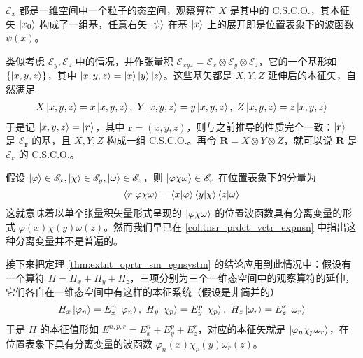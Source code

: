 \documentclass[cn,10pt,math=newtx,citestyle=gb7714-2015,bibstyle=gb7714-2015]{elegantbook}
\def\bm{\boldsymbol}
\def\ms{\mathscr}
\def\vphi{\varphi}
\def\ox{\otimes}
\begin{document}
$\ms E_x$ 都是一维空间中一个粒子的态空间，观察算符 $X$ 是其中的 C.S.C.O.，其本征矢 $\ket{x_0}$ 构成了一组基，任意右矢 $\ket{\psi}$ 在基 $\ket{x}$ 上的展开即是位置表象下的波函数 $\psi(x)$。

类似考虑 $\ms E_y,\ms E_z$ 中的情况，并作张量积 $\ms E_{xyz} = \ms E_x\ox\ms E_y\ox\ms E_z$，它的一个基形如 $\{\ket{x,y,z}\}$，其中 $\ket{x,y,z} = \ket x\ket y\ket z$。这些基矢都是 $X,Y,Z$ 延伸后的本征矢，自然满足
\begin{align}
    X\ket{x,y,z} = x\ket{x,y,z},\ Y\ket{x,y,z} = y\ket{x,y,z},\ Z\ket{x,y,z} = z\ket{x,y,z}
\end{align}
于是记 $\ket{x,y,z} = \ket{\bm r}$，其中 $\bm r = (x,y,z)$，则与之前推导的性质完全一致：$\ket{\bm r}$ 是 $\ms E_{\bm r}$ 的基，且 $X,Y,Z$ 构成一组 C.S.C.O.。再令 $\bm R = X\ox Y\ox Z$，就可以说 $\bm R$ 是 $\ms E_{\bm r}$ 的 C.S.C.O.。

假设 $\ket{\vphi}\in\ms E_x,\ket{\chi}\in\ms E_y,\ket{\omega}\in\ms E_z$，则 $\ket{\vphi\chi\omega}\in\ms E_{\bm r}$ 在位置表象下的分量为
\begin{equation}
    \braket{\bm r|\vphi\chi\omega} = \braket{x|\vphi}\braket{y|\chi}\braket{z|\omega}
\end{equation}
这就意味着以单个张量积矢量形式呈现的 $\ket{\vphi\chi\omega}$ 的位置波函数具有分离变量的形式 $\vphi(x)\chi(y)\omega(z)$。然而我们早已在 \ref{col:tnsr_prdct_vctr_expnsn} 中指出这种分离变量并不是普遍的。

接下来把定理 \ref{thm:extnt_oprtr_sm_egnsystm} 的结论应用到此情况中：假设有一个算符 $H=H_x+H_y+H_z$，三项分别为三个一维态空间中的观察算符的延伸，它们各自在一维态空间中有这样的本征系统（假设是非简并的）
\begin{equation}
    H_x\ket{\vphi_n} = E_x^n\ket{\vphi_n},\ H_y\ket{\chi_p} = E_y^p\ket{\chi_p},\ H_z\ket{\omega_r} = E_z^r\ket{\omega_r}
\end{equation}
于是 $H$ 的本征值形如 $E^{n,p,r} = E_x^n+E_y^p+E_z^r$，对应的本征矢就是 $\ket{\vphi_n\chi_p\omega_r}$，在位置表象下具有分离变量的波函数 $\vphi_n(x)\chi_p(y)\omega_r(z)$。
\end{document}
